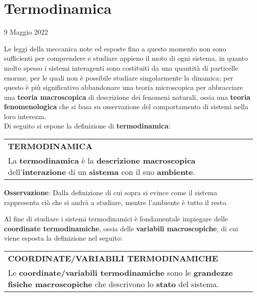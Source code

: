 \documentclass[a4paper]{extarticle}
\renewcommand\arraystretch{}
\begin{document}
\section{Termodinamica}
\noindent
\begin{center}
  9 Maggio 2022
\end{center}
Le leggi della meccanica note ed esposte fino a questo momento non sono sufficienti per comprendere e studiare appieno il moto di ogni sistema, in quanto molto spesso i sistemi interagenti sono costituiti da una quantità di particelle enorme, per le quali non è possibile studiare singolarmente la dinamica; per questo è più significativo abbandonare una teoria microscopica per abbracciare una \textbf{teoria macroscopica} di descrizione dei fenomeni naturali, ossia una \textbf{teoria fenomenologica} che si basa su osservazione del comportamento di sistemi nella loro interezza.\\
Di seguito si espone la definizione di \textbf{termodinamica}:

\vspace{1em}
\setlength{\tabcolsep}{14pt}
\renewcommand{\arraystretch}{2}
\noindent
\begin{tabularx}{\textwidth}{@{}|P|@{}}
    \hline
    {\textbf{TERMODINAMICA}}\\
    \parbox{\linewidth}{La \textbf{termodinamica} è la \textbf{descrizione macroscopica} dell'\textbf{interazione} di un \textbf{sistema} con il suo \textbf{ambiente}.\vspace{3mm}}\\
    \hline
\end{tabularx}

\vspace{2em}
\noindent
\textbf{Osservazione}: Dalla definizione di cui sopra si evince come il sistema rappresenta ciò che si andrà a studiare, mentre l'ambiente è tutto il resto.

\vspace{1em}
\noindent
Al fine di studiare i sistemi termodinamici è fondamentale impiegare delle \textbf{coordinate termodinamiche}, ossia delle \textbf{variabili macroscopiche}, di cui viene esposta la definizione nel seguito:

\vspace{1em}
\setlength{\tabcolsep}{14pt}
\renewcommand{\arraystretch}{2}
\noindent
\begin{tabularx}{\textwidth}{@{}|P|@{}}
    \hline
    {\textbf{COORDINATE/VARIABILI TERMODINAMICHE}}\\
    \parbox{\linewidth}{Le \textbf{coordinate/variabili termodinamiche} sono le \textbf{grandezze fisiche macroscopiche} che descrivono lo \textbf{stato} del sistema.\vspace{3mm}}\\
    \hline
\end{tabularx}
\end{document}
